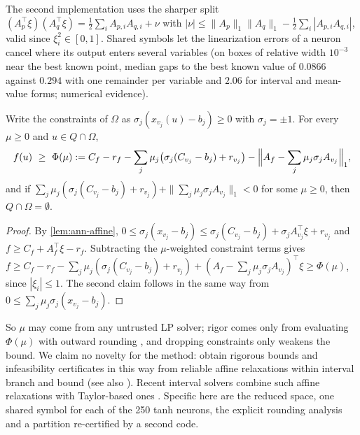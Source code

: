 The second implementation uses the sharper split $(A_p^{\top}\xi)(A_q^{\top}\xi)=\tfrac12\sum_iA_{p,i}A_{q,i}+\nu$ with $|\nu|\le\|A_p\|_1\|A_q\|_1-\tfrac12\sum_i|A_{p,i}A_{q,i}|$, valid since $\xi_i^2\in[0,1]$.
Shared symbols let the linearization errors of a neuron cancel where its output enters several variables (on boxes of relative width $10^{-3}$ near the best known point, median gaps to the best known value of $0.0866$ against $0.294$ with one remainder per variable and $2.06$ for interval and mean-value forms; numerical evidence).

\begin{lemma}\label{lem:ann-duality}
Write the constraints of $\Omega$ as $\sigma_j(x_{v_j}(u)-b_j)\ge0$ with $\sigma_j=\pm1$.
For every $\mu\ge0$ and $u\in Q\cap\Omega$,
\[
f(u)\ \ge\ \Phi(\mu):=C_f-r_f-\sum_j\mu_j\bigl(\sigma_j(C_{v_j}-b_j)+r_{v_j}\bigr)-\Bigl\|A_f-\sum_j\mu_j\sigma_jA_{v_j}\Bigr\|_1,
\]
and if $\sum_j\mu_j(\sigma_j(C_{v_j}-b_j)+r_{v_j})+\|\sum_j\mu_j\sigma_jA_{v_j}\|_1<0$ for some $\mu\ge0$, then $Q\cap\Omega=\emptyset$.
\end{lemma}

\begin{proof}
By \cref{lem:ann-affine}, $0\le\sigma_j(x_{v_j}-b_j)\le\sigma_j(C_{v_j}-b_j)+\sigma_jA_{v_j}^{\top}\xi+r_{v_j}$ and $f\ge C_f+A_f^{\top}\xi-r_f$.
Subtracting the $\mu$-weighted constraint terms gives $f\ge C_f-r_f-\sum_j\mu_j(\sigma_j(C_{v_j}-b_j)+r_{v_j})+(A_f-\sum_j\mu_j\sigma_jA_{v_j})^{\top}\xi\ge\Phi(\mu)$, since $|\xi_i|\le1$.
The second claim follows in the same way from $0\le\sum_j\mu_j\sigma_j(x_{v_j}-b_j)$.
\end{proof}

So $\mu$ may come from any untrusted LP solver; rigor comes only from evaluating $\Phi(\mu)$ with outward rounding \citep{neumaier2004-safe-bounds-in-linear-and}, and dropping constraints only weakens the bound.
We claim no novelty for the method: \citet{ninin2015-a-reliable-affine-relaxation-method} obtain rigorous bounds and infeasibility certificates in this way from reliable affine relaxations within interval branch and bound (see also \citealp{figueiredo1997-fast-interval-branch-and-bound,berz2009-rigorous-global-search-using-taylor}).
Recent interval solvers combine such affine relaxations with Taylor-based ones \citep{araya2025-hybridizing-two-linear-relaxation-techniques}.
Specific here are the reduced space, one shared symbol for each of the 250 tanh neurons, the explicit rounding analysis and a partition re-certified by a second code.

